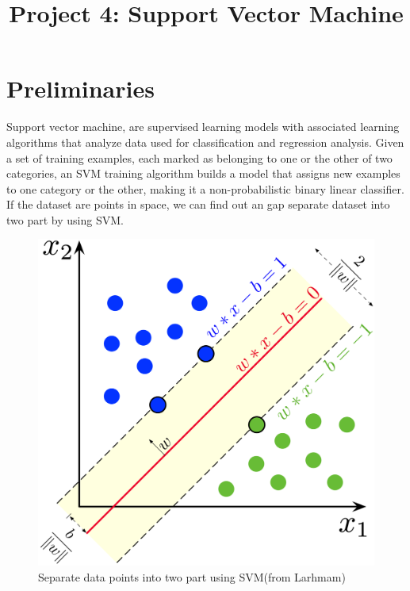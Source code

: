 \documentclass[conference,compsoc]{IEEEtran}
\begin{document}
\title{Project 4: Support Vector Machine}

\author{
}

\maketitle

\IEEEpeerreviewmaketitle

\section{Preliminaries}

Support vector machine, are supervised learning models with associated learning
algorithms that analyze data used for classification and regression analysis.
Given a set of training examples, each marked as belonging to one or the other
of two categories, an SVM training algorithm builds a model that assigns new
examples to one category or the other, making it a non-probabilistic binary
linear classifier.\cite{1} If the dataset are points in space, we can find out
an gap separate dataset into two part by using SVM.

\begin{figure}[ht!]
\centering
\includegraphics[width=0.65\linewidth]{1280px-SVM_margin.png}
\caption{Separate data points into two part using SVM(from Larhmam) 
	\label{SVM demostrains}}
\end{figure}
\end{document}
